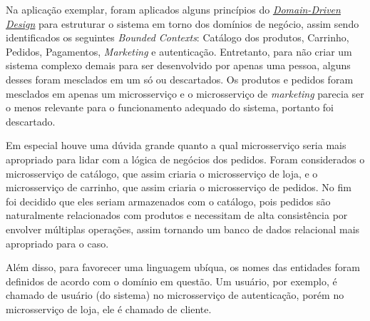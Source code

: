 Na aplicação exemplar, foram aplicados alguns princípios do \hyperref[section-ddd]{\emph{Domain-Driven Design}} para estruturar o sistema em torno dos domínios de negócio, assim sendo identificados os seguintes \emph{Bounded Contexts}: Catálogo dos produtos, Carrinho, Pedidos, Pagamentos, \emph{Marketing} e autenticação. Entretanto, para não criar um sistema complexo demais para ser desenvolvido por apenas uma pessoa, alguns desses foram mesclados em um só ou descartados. Os produtos e pedidos foram mesclados em apenas um microsserviço e o microsserviço de \emph{marketing} parecia ser o menos relevante para o funcionamento adequado do sistema, portanto foi descartado. 

Em especial houve uma dúvida grande quanto a qual microsserviço seria mais apropriado para lidar com a lógica de negócios dos pedidos. Foram considerados o microsserviço de catálogo, que assim criaria o microsserviço de loja, e o microsserviço de carrinho, que assim criaria o microsserviço de pedidos. No fim foi decidido que eles seriam armazenados com o catálogo, pois pedidos são naturalmente relacionados com produtos e necessitam de alta consistência por envolver múltiplas operações, assim tornando um banco de dados relacional mais apropriado para o caso.

Além disso, para favorecer uma linguagem ubíqua, os nomes das entidades foram definidos de acordo com o domínio em questão. Um usuário, por exemplo, é chamado de usuário (do sistema) no microsserviço de autenticação, porém no microsserviço de loja, ele é chamado de cliente.



